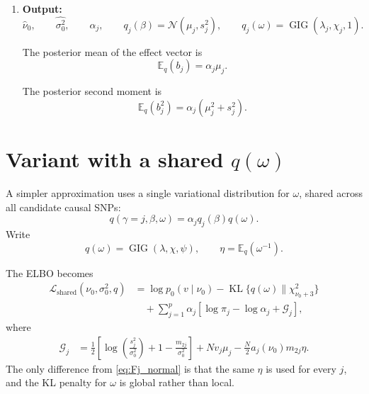 \documentclass[11pt]{article}
\newcommand{\nuo}{\nu_0}
\newcommand{\sigb}{\sigma_0^2}
\newcommand{\E}{\mathbb E}
\newcommand{\KL}{\operatorname{KL}}
\newcommand{\Normal}{\mathcal N}
\newcommand{\GIG}{\operatorname{GIG}}
\newcommand{\chisq}{\chi^2}
\begin{document}
\begin{enumerate}[leftmargin=2em]
\begin{enumerate}[leftmargin=2em]
\item Update posterior inclusion probabilities:
\[
\alpha_j
=
\frac{
\pi_j\exp(\mathcal F_j)
}{
\sum_{k=1}^p
\pi_k\exp(\mathcal F_k)
}.
\]

\item Update the prior variance:
\[
\sigb
\leftarrow
\sum_{j=1}^p
\alpha_j m_{2j}.
\]

\item Update the LD-mismatch parameter:
\[
\nuo
\leftarrow
\arg\max_{\nu>0}
\mathcal L(\nu,\sigb,q).
\]
This step is one-dimensional and can be done by grid search or numerical optimization over \(\log\nu\).

\end{enumerate}

\item \textbf{Output:}
\[
\widehat\nuo,
\qquad
\widehat{\sigb},
\qquad
\alpha_j,
\qquad
q_j(\beta)=\Normal(\mu_j,s_j^2),
\qquad
q_j(\omega)=\GIG(\lambda_j,\chi_j,1).
\]

The posterior mean of the effect vector is
\[
\E_q(b_j)=\alpha_j\mu_j.
\]

The posterior second moment is
\[
\E_q(b_j^2)=\alpha_j(\mu_j^2+s_j^2).
\]

\end{enumerate}

\section{Variant with a shared \(q(\omega)\)}

A simpler approximation uses a single variational distribution for \(\omega\),
shared across all candidate causal SNPs:
\[
q(\gamma=j,\beta,\omega)
=
\alpha_j q_j(\beta)q(\omega).
\]
Write
\[
q(\omega)=\GIG(\lambda,\chi,\psi),
\qquad
\eta=\E_q(\omega^{-1}).
\]

The ELBO becomes
\begin{align}
\mathcal L_{\mathrm{shared}}(\nuo,\sigb,q)
&=
\log p_0(v\mid\nuo)
-
\KL\{q(\omega)\|\chisq_{\nuo+3}\}
\nonumber\\
&\quad+
\sum_{j=1}^p
\alpha_j
\left[
\log \pi_j
-
\log \alpha_j
+
\mathcal G_j
\right],
\end{align}
where
\begin{align}
\mathcal G_j
&=
\frac12
\left[
\log\left(\frac{s_j^2}{\sigb}\right)
+
1
-
\frac{m_{2j}}{\sigb}
\right]
+
Nv_j\mu_j
-
\frac N2 a_j(\nuo)m_{2j}\eta.
\end{align}
The only difference from \eqref{eq:Fj_normal} is that the same \(\eta\) is used for every \(j\), and the KL penalty for \(\omega\) is global rather than local.
\end{document}
